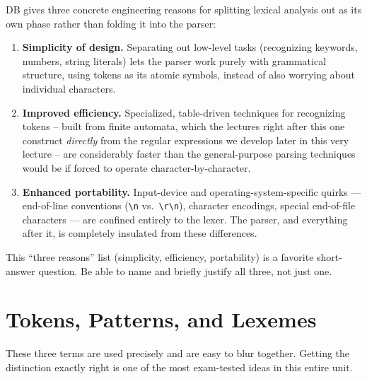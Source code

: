 \documentclass[full-course-notes.tex]{subfiles}
\begin{document}
\dbtag DB gives three concrete engineering reasons for splitting lexical analysis out as its own
phase rather than folding it into the parser:

\begin{enumerate}
  \item \textbf{Simplicity of design.} Separating out low-level tasks (recognizing keywords,
  numbers, string literals) lets the parser work purely with grammatical structure, using
  tokens as its atomic symbols, instead of also worrying about individual characters.
  \item \textbf{Improved efficiency.} Specialized, table-driven techniques for recognizing
  tokens -- built from finite automata, which the lectures right after this one construct
  \emph{directly} from the regular expressions we develop later in this very lecture -- are
  considerably faster than the general-purpose parsing techniques would be if forced to operate
  character-by-character.
  \item \textbf{Enhanced portability.} Input-device and operating-system-specific quirks ---
  end-of-line conventions (\texttt{\textbackslash n} vs.\ \texttt{\textbackslash r\textbackslash n}), character
  encodings, special end-of-file characters --- are confined entirely to the lexer. The parser,
  and everything after it, is completely insulated from these differences.
\end{enumerate}

\begin{examfocus}
This ``three reasons'' list (simplicity, efficiency, portability) is a favorite short-answer
question. Be able to name and briefly justify all three, not just one.
\end{examfocus}

\section{Tokens, Patterns, and Lexemes}
\label{sec:l3-tokens-patterns-lexemes}

\dbtag These three terms are used precisely and are easy to blur together. Getting the
distinction exactly right is one of the most exam-tested ideas in this entire unit.
\end{document}
